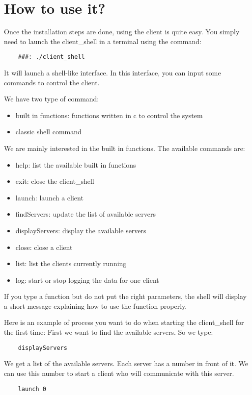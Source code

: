 \chapter{How to use it?}

Once the installation steps are done, using the client is quite easy.
You simply need to launch the client\_shell in a terminal using the command:
\begin{lstlisting}
	###: ./client_shell
\end{lstlisting}

It will launch a shell-like interface.
In this interface, you can input some commands to control the client.

We have two type of command:
\begin{itemize}
	\item built in functions: functions written in c to control the system
	\item classic shell command
\end{itemize}

We are mainly interested in the built in functions.
The available commands are:
\begin{itemize}
	\item help: list the available built in functions
	\item exit: close the client\_shell
	\item launch: launch a client
	\item findServers: update the list of available servers
	\item displayServers: display the available servers
	\item close: close a client
	\item list: list the clients currently running 
	\item log: start or stop logging the data for one client
\end{itemize}

If you type a function but do not put the right parameters, the shell will display a short message
explaining how to use the function properly.

Here is an example of process you want to do when starting the client\_shell for the first time:
First we want to find the available servers. So we type:
\begin{lstlisting}
	displayServers
\end{lstlisting}
We get a list of the available servers. Each server has a number in front of it. We can use this number to start a client who will communicate with this server.
\begin{lstlisting}
	launch 0
\end{lstlisting}

